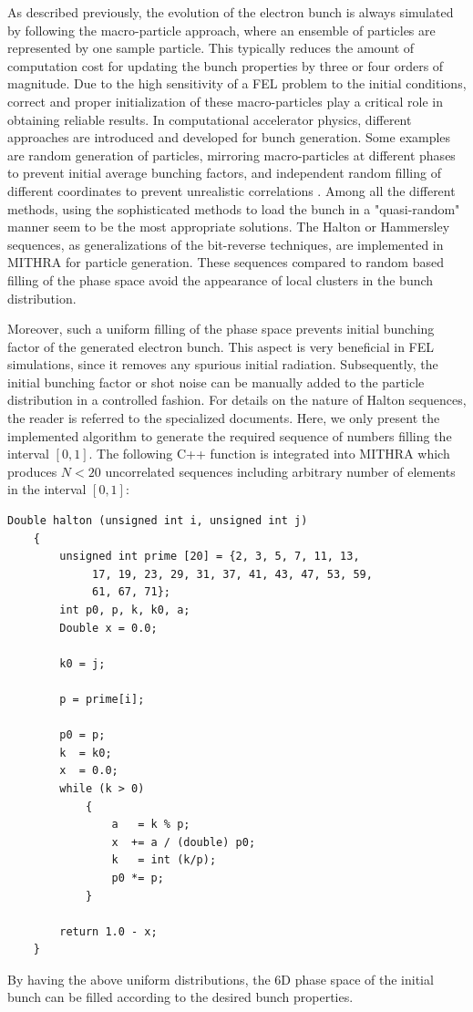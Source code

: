 As described previously, the evolution of the electron bunch is always simulated by following the macro-particle approach, where an ensemble of particles are represented by one sample particle.
%
This typically reduces the amount of computation cost for updating the bunch properties by three or four orders of magnitude.
%
Due to the high sensitivity of a FEL problem to the initial conditions, correct and proper initialization of these macro-particles play a critical role in obtaining reliable results.
%
In computational accelerator physics, different approaches are introduced and developed for bunch generation.
%
Some examples are random generation of particles, mirroring macro-particles at different phases to prevent initial average bunching factors, and independent random filling of different coordinates to prevent unrealistic correlations \cite{reiche2000numerical}.
%
Among all the different methods, using the sophisticated methods to load the bunch in a "quasi-random" manner seem to be the most appropriate solutions.
%
The Halton or Hammersley sequences, as generalizations of the bit-reverse techniques, are implemented in MITHRA for particle generation.
%
These sequences compared to random based filling of the phase space avoid the appearance of local clusters in the bunch distribution.

Moreover, such a uniform filling of the phase space prevents initial bunching factor of the generated electron bunch.
%
This aspect is very beneficial in FEL simulations, since it removes any spurious initial radiation.
%
Subsequently, the initial bunching factor or shot noise can be manually added to the particle distribution in a controlled fashion. 
%
For details on the nature of Halton sequences, the reader is referred to the specialized documents.
%
Here, we only present the implemented algorithm to generate the required sequence of numbers filling the interval $[0,1]$.
%
The following C++ function is integrated into MITHRA which produces $N<20$ uncorrelated sequences including arbitrary number of elements in the interval $[0,1]$:
%
\begin{multicols}{2}
	\setlength{\columnseprule}{0.2pt}
	\begin{Verbatim}[fontsize=\footnotesize, tabsize=2, fontfamily=courier,	fontseries=b]
	Double halton (unsigned int i, unsigned int j)
	{
		unsigned int prime [20] = {2, 3, 5, 7, 11, 13, 
			 17, 19, 23, 29, 31, 37, 41, 43, 47, 53, 59, 
			 61, 67, 71};
		int p0, p, k, k0, a;
		Double x = 0.0;
	
		k0 = j;
	
		p = prime[i];
	
		p0 = p;
		k  = k0;
		x  = 0.0;
		while (k > 0)
			{
				a   = k % p;
				x  += a / (double) p0;
				k   = int (k/p);
				p0 *= p;
			}
	
		return 1.0 - x;
	}
	\end{Verbatim}
\end{multicols}
%
\noindent By having the above uniform distributions, the 6D phase space of the initial bunch can be filled according to the desired bunch properties.

